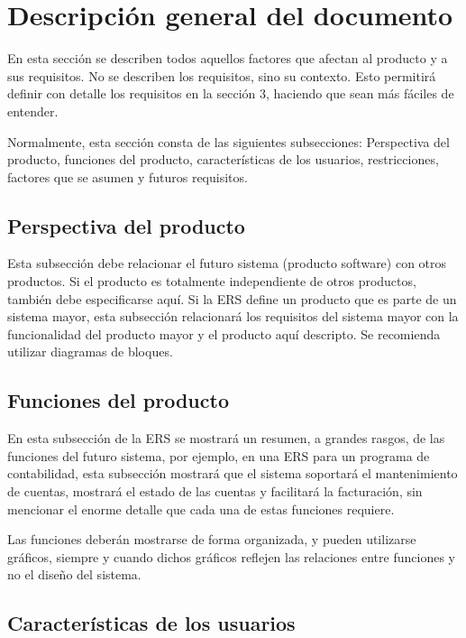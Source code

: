 \documentclass[12pt,a4paper, twosite]{article}
\begin{document}
\section{Descripción general del documento}
\label{sec:orgc1c4017}

En esta sección se describen todos aquellos factores que afectan al
producto y a sus requisitos. No se describen los requisitos, sino su
contexto. Esto permitirá definir con detalle los requisitos en la
sección 3, haciendo que sean más fáciles de entender.

Normalmente, esta sección consta de las siguientes subsecciones:
Perspectiva del producto, funciones del producto, características de
los usuarios, restricciones, factores que se asumen y futuros
requisitos.


\subsection{Perspectiva del producto}
\label{sec:org24980a8}

Esta subsección debe relacionar el futuro sistema (producto
software) con otros productos. Si el producto es totalmente
independiente de otros productos, también debe especificarse
aquí. Si la ERS define un producto que es parte de un sistema mayor,
esta subsección relacionará los requisitos del sistema mayor con la
funcionalidad del producto mayor y el producto aquí descripto. Se
recomienda utilizar diagramas de bloques.


\subsection{Funciones del producto}
\label{sec:orgaf51da6}

En esta subsección de la ERS se mostrará un resumen, a grandes
rasgos, de las funciones del futuro sistema, por ejemplo, en una ERS
para un programa de contabilidad, esta subsección mostrará que el
sistema soportará el mantenimiento de cuentas, mostrará el estado de
las cuentas y facilitará la facturación, sin mencionar el enorme
detalle que cada una de estas funciones requiere.

Las funciones deberán mostrarse de forma organizada, y pueden
utilizarse gráficos, siempre y cuando dichos gráficos reflejen las
relaciones entre funciones y no el diseño del sistema.


\subsection{Características de los usuarios}
\label{sec:orga40b0ee}
\end{document}
